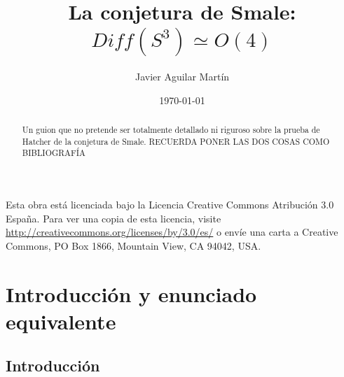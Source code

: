 \documentclass[twoside, 11pt]{article}
\begin{document}

\author{Javier Aguilar Martín }
\date{\today}
\title{La conjetura de Smale:\\ $Diff(S^3)\simeq O(4)$}

\maketitle


\begin{abstract}
Un guion que no pretende ser totalmente detallado ni riguroso sobre la prueba de Hatcher de la conjetura de Smale. RECUERDA PONER LAS DOS COSAS COMO BIBLIOGRAFÍA
\end{abstract}


	\vfill
	Esta obra está licenciada bajo la Licencia Creative Commons Atribución 3.0 España. Para ver una copia de esta licencia, visite \url{http://creativecommons.org/licenses/by/3.0/es/} o envíe una carta a Creative Commons, PO Box 1866, Mountain View, CA 94042, USA.


\newpage
\tableofcontents

\newpage

\section{Introducción y enunciado equivalente}
\subsection{Introducción}
\end{document}
